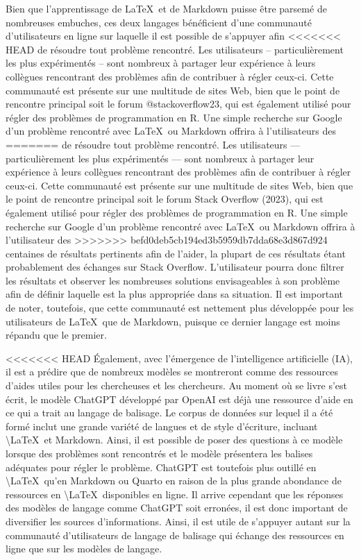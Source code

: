 \documentclass[
  letterpaper,
]{scrbook}
\begin{document}
Bien que l'apprentissage de \LaTeX~et de Markdown puisse être parsemé de
nombreuses embuches, ces deux langages bénéficient d'une communauté
d'utilisateurs en ligne sur laquelle il est possible de s'appuyer afin
<<<<<<< HEAD
de résoudre tout problème rencontré. Les utilisateurs --
particulièrement les plus expérimentés -- sont nombreux à partager leur
expérience à leurs collègues rencontrant des problèmes afin de
contribuer à régler ceux-ci. Cette communauté est présente sur une
multitude de sites Web, bien que le point de rencontre principal soit le
forum @stackoverflow23, qui est également utilisé pour régler des
problèmes de programmation en R. Une simple recherche sur Google d'un
problème rencontré avec \LaTeX~ou Markdown offrira à l'utilisateurs des
=======
de résoudre tout problème rencontré. Les utilisateurs ---
particulièrement les plus expérimentés --- sont nombreux à partager leur
expérience à leurs collègues rencontrant des problèmes afin de
contribuer à régler ceux-ci. Cette communauté est présente sur une
multitude de sites Web, bien que le point de rencontre principal soit le
forum Stack Overflow (2023), qui est également utilisé pour régler des
problèmes de programmation en R. Une simple recherche sur Google d'un
problème rencontré avec \LaTeX~ou Markdown offrira à l'utilisateur des
>>>>>>> befd0deb5cb194ed3b5959db7dda68e3d867d924
centaines de résultats pertinents afin de l'aider, la plupart de ces
résultats étant probablement des échanges sur Stack Overflow.
L'utilisateur pourra donc filtrer les résultats et observer les
nombreuses solutions envisageables à son problème afin de définir
laquelle est la plus appropriée dans sa situation. Il est important de
noter, toutefois, que cette communauté est nettement plus développée
pour les utilisateurs de \LaTeX~que de Markdown, puisque ce dernier
langage est moins répandu que le premier.

<<<<<<< HEAD
Également, avec l'émergence de l'intelligence artificielle (IA), il est
a prédire que de nombreux modèles se montreront comme des ressources
d'aides utiles pour les chercheuses et les chercheurs. Au moment où se
livre s'est écrit, le modèle ChatGPT développé par OpenAI est déjà une
ressource d'aide en ce qui a trait au langage de balisage. Le corpus de
données sur lequel il a été formé inclut une grande variété de langues
et de style d'écriture, incluant \textbackslash LaTeX~et Markdown.
Ainsi, il est possible de poser des questions à ce modèle lorsque des
problèmes sont rencontrés et le modèle présentera les balises adéquates
pour régler le problème. ChatGPT est toutefois plus outillé en
\textbackslash LaTeX~qu'en Markdown ou Quarto en raison de la plus
grande abondance de ressources en \textbackslash LaTeX~disponibles en
ligne. Il arrive cependant que les réponses des modèles de langage comme
ChatGPT soit erronées, il est donc important de diversifier les sources
d'informations. Ainsi, il est utile de s'appuyer autant sur la
communauté d'utilisateurs de langage de balisage qui échange des
ressources en ligne que sur les modèles de langage.
\end{document}
